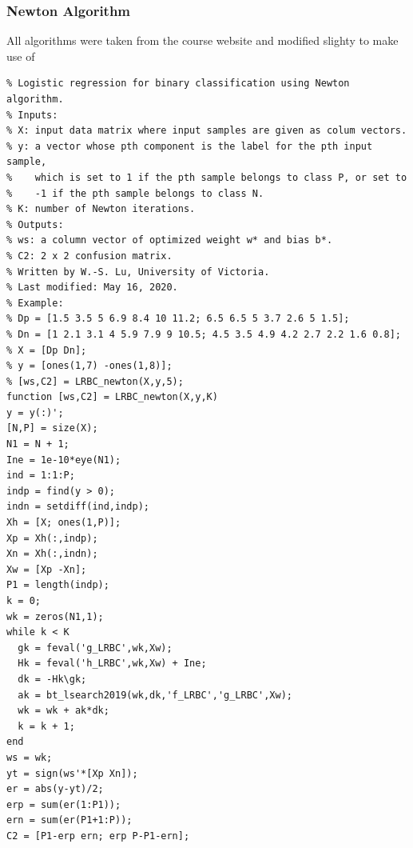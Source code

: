 \documentclass[12pt,conference]{IEEEtran}
\begin{document}
\begin{appendices}
\subsubsection{Newton Algorithm}
All algorithms were taken from the course website and modified slighty to make use of 
\label{AppendixB-Newton}
\begin{verbatim}
% Logistic regression for binary classification using Newton algorithm.
% Inputs:
% X: input data matrix where input samples are given as colum vectors.
% y: a vector whose pth component is the label for the pth input sample,
%    which is set to 1 if the pth sample belongs to class P, or set to
%    -1 if the pth sample belongs to class N.
% K: number of Newton iterations.
% Outputs:
% ws: a column vector of optimized weight w* and bias b*.
% C2: 2 x 2 confusion matrix.
% Written by W.-S. Lu, University of Victoria.
% Last modified: May 16, 2020.
% Example: 
% Dp = [1.5 3.5 5 6.9 8.4 10 11.2; 6.5 6.5 5 3.7 2.6 5 1.5];
% Dn = [1 2.1 3.1 4 5.9 7.9 9 10.5; 4.5 3.5 4.9 4.2 2.7 2.2 1.6 0.8];
% X = [Dp Dn];
% y = [ones(1,7) -ones(1,8)];
% [ws,C2] = LRBC_newton(X,y,5);
function [ws,C2] = LRBC_newton(X,y,K)
y = y(:)';
[N,P] = size(X);
N1 = N + 1;
Ine = 1e-10*eye(N1);
ind = 1:1:P;
indp = find(y > 0);
indn = setdiff(ind,indp);
Xh = [X; ones(1,P)];
Xp = Xh(:,indp);
Xn = Xh(:,indn);
Xw = [Xp -Xn];
P1 = length(indp);
k = 0;
wk = zeros(N1,1);
while k < K
  gk = feval('g_LRBC',wk,Xw);
  Hk = feval('h_LRBC',wk,Xw) + Ine;
  dk = -Hk\gk;
  ak = bt_lsearch2019(wk,dk,'f_LRBC','g_LRBC',Xw);
  wk = wk + ak*dk;
  k = k + 1;
end
ws = wk;
yt = sign(ws'*[Xp Xn]);
er = abs(y-yt)/2;
erp = sum(er(1:P1));
ern = sum(er(P1+1:P));
C2 = [P1-erp ern; erp P-P1-ern];
\end{verbatim}


\end{appendices}
\end{document}
